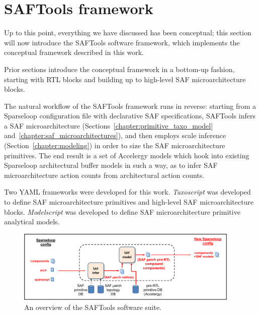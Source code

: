 \chapter{SAFTools framework}
\label{chapter:framework}


Up to this point, everything we have discussed has been conceptual; this section will now introduce the SAFTools software framework, which implements the conceptual framework described in this work.

Prior sections introduce the conceptual framework in a bottom-up fashion, starting with RTL blocks and building up to high-level SAF microarchitecture blocks.

The natural workflow of the SAFTools framework runs in reverse: starting from a Sparseloop configuration file with declarative SAF specifications, SAFTools infers a SAF microarchitecture (Sections~\ref{chapter:primitive_taxo_model} and~\ref{chapter:saf_microarchitectures}), and then employs scale inference (Section~\ref{chapter:modeling}) in order to size the SAF microarchitecture primitives. The end result is a set of Accelergy models which hook into existing Sparseloop architectural buffer models in such a way, as to infer SAF microarchitecture action counts from architectural action counts.

Two YAML frameworks were developed for this work. \textit{Taxoscript} was developed to define SAF microarchitecture primitives and high-level SAF microarchitecture blocks. \textit{Modelscript} was developed to define SAF microarchitecture primitive analytical models.

\begin{figure}[H]
\centering
\includegraphics[width=0.95\textwidth]{figures/saftools_overview.pdf}
\caption{An overview of the SAFTools software suite.}
\label{fig:saftools_overview}
\end{figure}

